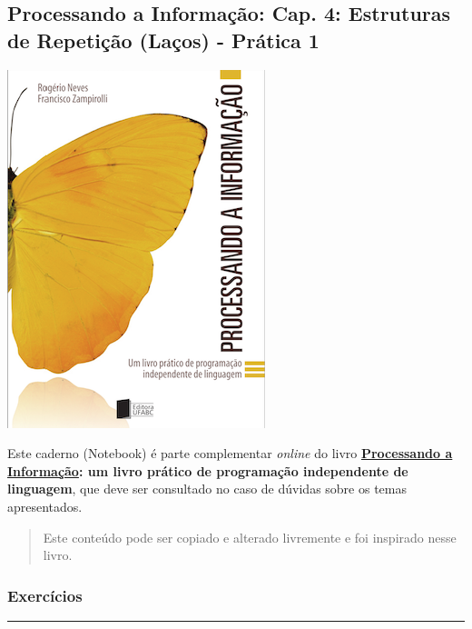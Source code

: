 \documentclass[12pt,a4paper]{article}
\begin{document}
    \hypertarget{processando-a-informauxe7uxe3o-cap.-4-estruturas-de-repetiuxe7uxe3o-lauxe7os---pruxe1tica-1}{%
\subsection{Processando a Informação: Cap. 4: Estruturas de Repetição
(Laços) - Prática
1}\label{processando-a-informauxe7uxe3o-cap.-4-estruturas-de-repetiuxe7uxe3o-lauxe7os---pruxe1tica-1}}

    \includegraphics{"figs/Capa_Processando_Informacao.jpg"}

Este caderno (Notebook) é parte complementar \emph{online} do livro
\textbf{\href{https://editora.ufabc.edu.br/matematica-e-ciencias-da-computacao/58-processando-a-informacao}{Processando
a Informação}: um livro prático de programação independente de
linguagem}, que deve ser consultado no caso de dúvidas sobre os temas
apresentados.

\begin{quote}
Este conteúdo pode ser copiado e alterado livremente e foi inspirado
nesse livro.
\end{quote}

    \hypertarget{exercuxedcios}{%
\subsubsection{Exercícios}\label{exercuxedcios}}

    \begin{center}\rule{0.5\linewidth}{0.5pt}\end{center}
\end{document}
